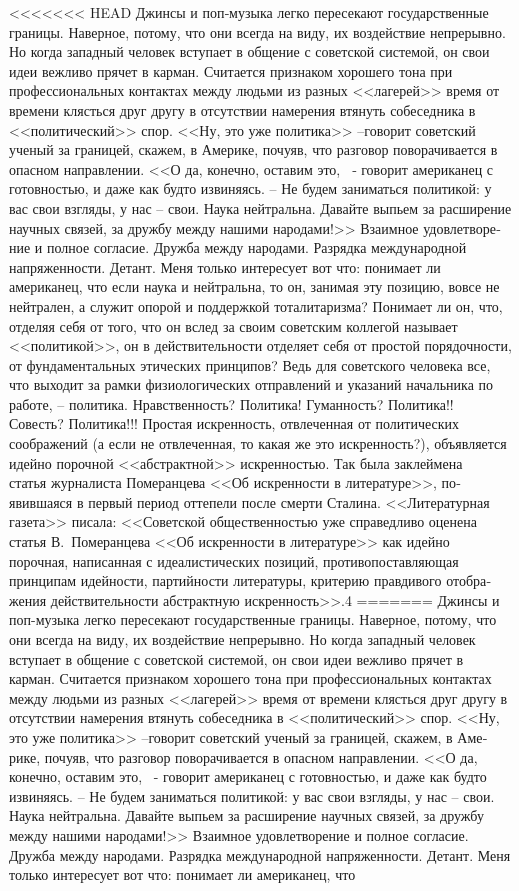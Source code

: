 \documentclass{book}
\begin{document}
{<<<<<<< HEAD
Джинсы и поп‑музыка легко пересекают государственные границы. Наверное, потому, что они всегда на виду, их воздей­ствие непрерывно. Но когда западный человек вступает в об­щение с советской системой, он свои идеи вежливо прячет в карман. Считается признаком хорошего тона при професси­ональных контактах между людьми из разных <<лагерей>> время от времени клясться друг другу в отсутствии намерения втя­нуть собеседника в <<политический>> спор. <<Ну, это уже политика>> --говорит советский ученый за границей, скажем, в Аме­рике, почуяв, что разговор поворачивается в опасном направ­лении. <<О да, конечно, оставим это, ~‑ говорит американец с готовностью, и даже как будто извиняясь. -- Не будем зани­маться политикой: у вас свои взгляды, у нас -- свои. Наука нейтральна. Давайте выпьем за расширение научных связей, за дружбу между нашими народами!>> Взаимное удовлетворе­ние и полное согласие. Дружба между народами. Разрядка меж­дународной напряженности. Детант. Меня только интересует вот что: понимает ли американец, что если наука и нейтральна, то он, занимая эту позицию, вовсе не нейтрален, а служит опо­рой и поддержкой тоталитаризма? Понимает ли он, что, отделяя себя от того, что он вслед за своим советским коллегой назы­вает <<политикой>>, он в действительности отделяет себя от простой порядочности, от фундаментальных этических прин­ципов? Ведь для советского человека все, что выходит за рамки физиологических отправлений и указаний начальника по рабо­те, -- политика. Нравственность? Политика! Гуманность? По­литика!! Совесть? Политика!!! Простая искренность, отвлечен­ная от политических соображений (а если не отвлеченная, то какая же это искренность?), объявляется идейно порочной <<абстрактной>> искренностью. Так была заклеймена   статья журналиста Померанцева <<Об искренности в литературе>>, по­явившаяся в первый период оттепели после смерти Сталина. <<Литературная газета>> писала: <<Советской общественностью уже справедливо оценена статья В.~Померанцева <<Об искрен­ности в литературе>> как идейно порочная, написанная с иде­алистических позиций, противопоставляющая принципам идей­ности, партийности литературы, критерию правдивого отобра­жения действительности абстрактную искренность>>.4
=======
Джинсы и поп-музыка легко пересекают государственные границы. Наверное, потому, что они всегда на виду, их воздей­ствие непрерывно. Но когда западный человек вступает в об­щение с советской системой, он свои идеи вежливо прячет в карман. Считается признаком хорошего тона при професси­ональных контактах между людьми из разных <<лагерей>> время от времени клясться друг другу в отсутствии намерения втя­нуть собеседника в <<политический>> спор. <<Ну, это уже политика>> --говорит советский ученый за границей, скажем, в Аме­рике, почуяв, что разговор поворачивается в опасном направ­лении. <<О да, конечно, оставим это, ~- говорит американец с готовностью, и даже как будто извиняясь. -- Не будем зани­маться политикой: у вас свои взгляды, у нас -- свои. Наука нейтральна. Давайте выпьем за расширение научных связей, за дружбу между нашими народами!>> Взаимное удовлетворе­ние и полное согласие. Дружба между народами. Разрядка меж­дународной напряженности. Детант. Меня только интересует вот что: понимает ли американец, что 
}
\end{document}
